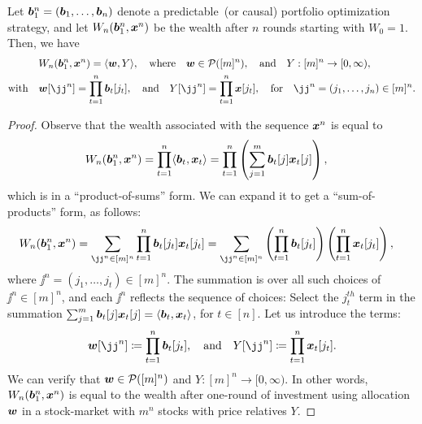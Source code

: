 \documentclass[12pt]{article}
\begin{document}
\begin{lemma}
    \label{lemma:minimax-portfolio-1} Let $\boldsymbol{b}_1^n = (\boldsymbol{b}_1,\ldots, \boldsymbol{b}_n)$ denote a predictable~(or causal) portfolio optimization strategy, and let $W_n(\boldsymbol{b}_1^n, {\boldsymbol x}^n)$  be the wealth after $n$ rounds starting with $W_0=1$. Then, we have 
    \begin{align}
        &W_n(\bb_1^n, \x^n) = \langle \w, Y \rangle, \qtext{where}\w \in \calP([m]^n), \qtext{and} Y: [m]^n \to [0, \infty), \\
        \text{with} \quad & 
        \w[\jj^n] = \prod_{t=1}^n \bb_t[j_t], \qtext{and} Y[\jj^n] = \prod_{t=1}^n \x[j_t], \qtext{for} \jj^n = (j_1, \ldots, j_n) \in [m]^n.  
    \end{align}
\end{lemma}
\begin{proof}
    Observe that the wealth associated with the sequence ${\boldsymbol x}^n$ is equal to 
    \begin{align}
        W_n(\boldsymbol{b}_1^n, {\boldsymbol x}^n) &= \prod_{t=1}^n \langle \boldsymbol{b}_t, {\boldsymbol x}_t \rangle = \prod_{t=1}^n \left( \sum_{j=1}^m \boldsymbol{b}_t[j] {\boldsymbol x}_t[j] \right), 
    \end{align}
    which is in a ``product-of-sums'' form. We can expand it to get a ``sum-of-products'' form, as follows: 
    \begin{align}
        W_n(\bb_1^n, \x^n) & = \sum_{\jj^n \in [m]^n} \prod_{t=1}^n \bb_t[j_t] \x_t[j_t]  = \sum_{\jj^n \in [m]^n} \lp \prod_{t=1}^n \bb_t[j_t] \rp \lp \prod_{t=1}^n \x_t[j_t]\rp, 
    \end{align} 
where $\jj^n = (j_1, \ldots, j_t) \in [m]^n$. The summation is over all such choices of $\jj^n \in [m]^n$, and each $\jj^n$ reflects the sequence of choices: Select the $j_t^{th}$ term in the summation $\sum_{j=1}^m \boldsymbol{b}_t[j] {\boldsymbol x}_t[j] = \langle \boldsymbol{b}_t, {\boldsymbol x}_t \rangle$, for $t \in [n]$. Let us introduce the terms: 
\begin{align}
    \w[\jj^n] \coloneqq \prod_{t=1}^n \bb_t[j_t], \qtext{and} Y[\jj^n] \coloneqq \prod_{t=1}^n \x_t[j_t]. 
\end{align}
We can verify that ${\boldsymbol w} \in {\cal P}([m]^n)$ and $Y:[m]^n \to [0, \infty)$. In other words, $W_n(\boldsymbol{b}_1^n, {\boldsymbol x}^n)$ is equal to the wealth after one-round of investment using allocation ${\boldsymbol w}$ in a stock-market with $m^n$ stocks with price relatives $Y$. 
\end{proof}
\end{document}
